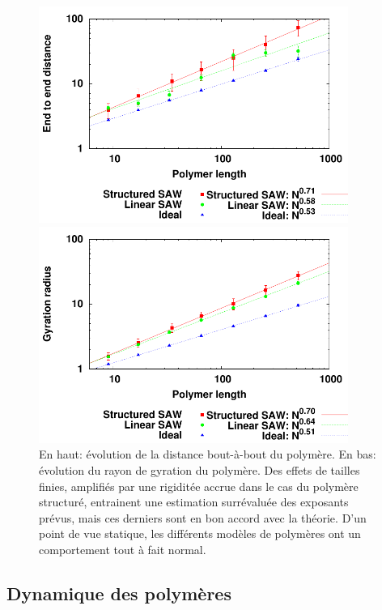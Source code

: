 \documentclass[a4paper,11pt]{article}
\begin{document}
\begin{figure}[H]
\begin{center}
\includegraphics[width=0.9\textwidth]{endtoenddistance.pdf}

\includegraphics[width=0.9\textwidth]{gyration.pdf}

\caption{En haut: évolution de la distance bout-à-bout du polymère. En bas: évolution du rayon de gyration du polymère. Des effets de tailles finies, amplifiés par une rigiditée accrue dans le cas du polymère structuré, entrainent une estimation surrévaluée des exposants prévus, mais ces derniers sont en bon accord avec la théorie. D'un point de vue statique, les différents modèles de polymères ont un comportement tout à fait normal.}
\label{statiquenum}
\end{center}
\end{figure}

\subsection{Dynamique des polymères}
\end{document}
